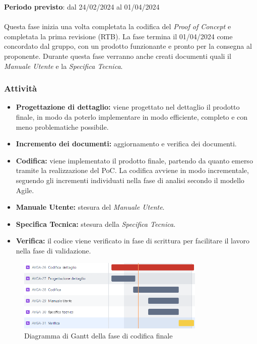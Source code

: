 \textbf{Periodo previsto}: dal 24/02/2024 al 01/04/2024\\\\
Questa fase inizia una volta completata la codifica del \textit{Proof of Concept} e completata la prima revisione (RTB). La fase termina il 01/04/2024 come concordato dal gruppo, con un prodotto funzionante e pronto per la consegna al proponente. Durante questa fase verranno anche creati documenti quali il \textit{Manuale Utente} e la \textit{Specifica Tecnica}.


\subsubsection{Attività}\label{sec:pianificazione:prog_codifica:attivita}
\begin{itemize}
    \item \textbf{Progettazione di dettaglio:} viene progettato nel dettaglio il prodotto finale, in modo da poterlo implementare in modo efficiente, completo e con meno problematiche possibile. 
    \item \textbf{Incremento dei documenti:} aggiornamento e verifica dei documenti.
    \item \textbf{Codifica:} viene implementato il prodotto finale, partendo da quanto emerso tramite la realizzazione del PoC. La codifica avviene in modo incrementale, seguendo gli incrementi individuati nella fase di analisi secondo il modello Agile.
    \item \textbf{Manuale Utente:} stesura del \textit{Manuale Utente}.
    \item \textbf{Specifica Tecnica:} stesura della \textit{Specifica Tecnica}.
    \item \textbf{Verifica:} il codice viene verificato in fase di scrittura per facilitare il lavoro nella fase di validazione.
\end{itemize}
\begin{figure}[H]
    \centering
    \includegraphics[width=0.8\textwidth]{images/gantt_dettaglio.PNG}
    \caption{Diagramma di Gantt della fase di codifica finale}
    \label{fig:gantt_codRTB}
\end{figure}

